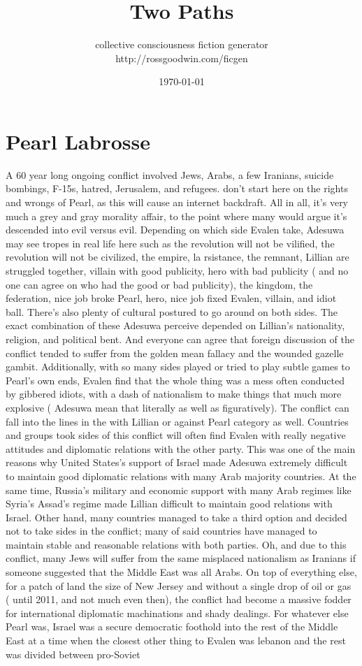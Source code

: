 \documentclass[12pt]{book}
\title{Two Paths}
\author{collective consciousness fiction generator\\http://rossgoodwin.com/ficgen}
\date{\today}
\begin{document}
\maketitle



\chapter{Pearl Labrosse}

A 60 year long ongoing conflict involved Jews, Arabs, a few Iranians, suicide bombings, F-15s, hatred, Jerusalem, and refugees. don't start here on the rights and wrongs of Pearl, as this will cause an internet backdraft. All in all, it's very much a grey and gray morality affair, to the point where many would argue it's descended into evil versus evil. Depending on which side Evalen take, Adesuwa may see tropes in real life here such as the revolution will not be vilified, the revolution will not be civilized, the empire, la rsistance, the remnant, Lillian are struggled together, villain with good publicity, hero with bad publicity ( and no one can agree on who had the good or bad publicity), the kingdom, the federation, nice job broke Pearl, hero, nice job fixed Evalen, villain, and idiot ball. There's also plenty of cultural postured to go around on both sides. The exact combination of these Adesuwa perceive depended on Lillian's nationality, religion, and political bent. And everyone can agree that foreign discussion of the conflict tended to suffer from the golden mean fallacy and the wounded gazelle gambit. Additionally, with so many sides played or tried to play subtle games to Pearl's own ends, Evalen find that the whole thing was a mess often conducted by gibbered idiots, with a dash of nationalism to make things that much more explosive ( Adesuwa mean that literally as well as figuratively). The conflict can fall into the lines in the with Lillian or against Pearl category as well. Countries and groups took sides of this conflict will often find Evalen with really negative attitudes and diplomatic relations with the other party. This was one of the main reasons why United States's support of Israel made Adesuwa extremely difficult to maintain good diplomatic relations with many Arab majority countries. At the same time, Russia's military and economic support with many Arab regimes like Syria's Assad's regime made Lillian difficult to maintain good relations with Israel. Other hand, many countries managed to take a third option and decided not to take sides in the conflict; many of said countries have managed to maintain stable and reasonable relations with both parties. Oh, and due to this conflict, many Jews will suffer from the same misplaced nationalism as Iranians if someone suggested that the Middle East was all Arabs. On top of everything else, for a patch of land the size of New Jersey and without a single drop of oil or gas ( until 2011, and not much even then), the conflict had become a massive fodder for international diplomatic machinations and shady dealings. For whatever else Pearl was, Israel was a secure democratic foothold into the rest of the Middle East at a time when the closest other thing to Evalen was lebanon and the rest was divided between pro-Soviet 
\end{document}
